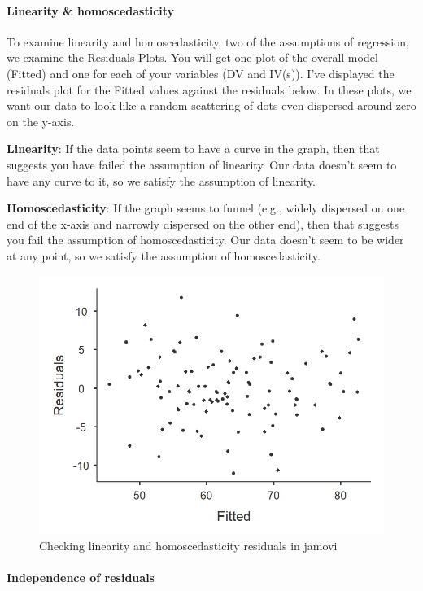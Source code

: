 \documentclass[
]{book}
\begin{document}
\hypertarget{linearity-homoscedasticity}{%
\paragraph{Linearity \& homoscedasticity}\label{linearity-homoscedasticity}}

To examine linearity and homoscedasticity, two of the assumptions of regression, we examine the Residuals Plots. You will get one plot of the overall model (Fitted) and one for each of your variables (DV and IV(s)). I've displayed the residuals plot for the Fitted values against the residuals below. In these plots, we want our data to look like a random scattering of dots even dispersed around zero on the y-axis.

\textbf{Linearity}: If the data points seem to have a curve in the graph, then that suggests you have failed the assumption of linearity. Our data doesn't seem to have any curve to it, so we satisfy the assumption of linearity.

\textbf{Homoscedasticity}: If the graph seems to funnel (e.g., widely dispersed on one end of the x-axis and narrowly dispersed on the other end), then that suggests you fail the assumption of homoscedasticity. Our data doesn't seem to be wider at any point, so we satisfy the assumption of homoscedasticity.

\begin{figure}

{\centering \includegraphics[width=0.49\linewidth]{images/13-regression/regression-residuals} 

}

\caption{Checking linearity and homoscedasticity residuals in jamovi}\label{fig:unnamed-chunk-7}
\end{figure}

\hypertarget{independence-of-residuals}{%
\paragraph{Independence of residuals}\label{independence-of-residuals}}
\end{document}
